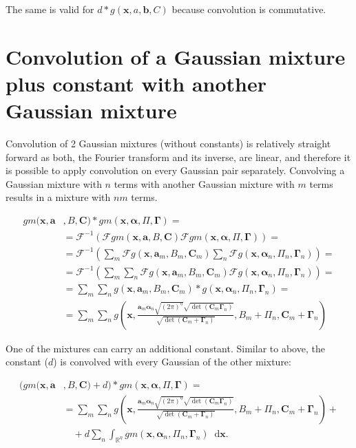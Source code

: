 \documentclass{paper}
\newcommand{\F}{\ensuremath{\mathcal{F}}}
\newcommand{\vr}[1]{\ensuremath{\boldsymbol{#1}}}
\newcommand{\tr}[1]{\ensuremath{\boldsymbol{#1}}}
\newcommand{\f}[1]{#1}
\newcommand*\diff{\mathop{}\!\mathrm{d}}
\newcommand{\alphavec}[0]{\ensuremath{\vr{\alpha{}}}}
\newcommand{\avec}[0]{\ensuremath{\vr{a}}}
\newcommand{\bvec}[0]{\ensuremath{\vr{b}}}
\newcommand{\xvec}[0]{\ensuremath{\vr{x}}}
\newcommand{\Ctns}[0]{\ensuremath{\tr{C}}}
\newcommand{\Gammatns}[0]{\ensuremath{\tr{\Gamma}}}
\begin{document}
The same is valid for $d \ast g(\xvec, a, \bvec, C)$ because convolution is commutative.

\section{Convolution of a Gaussian mixture plus constant with another Gaussian mixture}
Convolution of 2 Gaussian mixtures (without constants) is relatively straight forward as both, the Fourier transform and its inverse, are linear, and therefore it is possible to apply convolution on every Gaussian pair separately.
Convolving a Gaussian mixture with $n$ terms with another Gaussian mixture with $m$ terms results in a mixture with $nm$ terms.

\begin{align*}
	\f{gm}(\xvec, \avec&, B, \Ctns) \ast \f{gm}(\xvec, \alphavec, \Pi, \Gammatns) = \\
	&= \F^{-1}\left(\F\f{gm}(\xvec, \avec, B, \Ctns) \F\f{gm}(\xvec, \alphavec, \Pi, \Gammatns)\right) = \\
	&= \F^{-1}\left(\sum_{m}\F g(\xvec, \avec_m, B_{m}, \Ctns_{m}) \sum_n \F g(\xvec, \alphavec_n, \Pi_{n}, \Gammatns_{n})\right) = \\
	&= \F^{-1}\left(\sum_{m}\sum_n  \F g(\xvec, \avec_m, B_{m}, \Ctns_{m}) \F g(\xvec, \alphavec_n, \Pi_{n}, \Gammatns_{n})\right) = \\
	&= \sum_{m}\sum_n g(\xvec, \avec_m, B_{m}, \Ctns_{m}) \ast g(\xvec, \alphavec_n, \Pi_{n}, \Gammatns_{n}) = \\
	&= \sum_{m}\sum_n g\left(\xvec, \frac{\avec_m \alphavec_n \sqrt{(2 \pi)^\eta} \sqrt{\det(\Ctns_{m}\Gammatns_{n})}}{\sqrt{\det(\Ctns_{m}+\Gammatns_{n})}}, B_{m} + \Pi_{n}, \Ctns_{m} + \Gammatns_{n}\right)
\end{align*}

One of the mixtures can carry an additional constant.
Similar to above, the constant ($d$) is convolved with every Gaussian of the other mixture:

\begin{align*}
\Big( \f{gm}(\xvec, \avec&, B, \Ctns) + d \Big)  \ast \f{gm}(\xvec, \alphavec, \Pi, \Gammatns) = \\
&= \sum_{m}\sum_n g\left(\xvec, \frac{\avec_m \alphavec_n \sqrt{(2 \pi)^\eta} \sqrt{\det(\Ctns_{m}\Gammatns_{n})}}{\sqrt{\det(\Ctns_{m}+\Gammatns_{n})}}, B_{m} + \Pi_{n}, \Ctns_{m} +
\Gammatns_{n}\right) + \\
&\quad + d \sum_n \int_{\mathbb{R}^\eta} \f{gm}(\xvec, \alphavec_n, \Pi_n, \Gammatns_n) \diff \xvec.
\end{align*}



\end{document}
